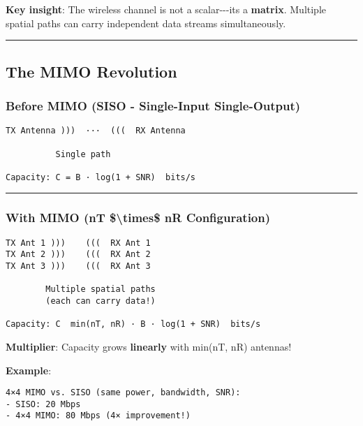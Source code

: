 \textbf{Key insight}: The wireless channel is not a
scalar-\/-\/-it\textquotesingle s a \textbf{matrix}. Multiple spatial
paths can carry independent data streams simultaneously.

\begin{center}\rule{0.5\linewidth}{0.5pt}\end{center}

\subsection{\texorpdfstring{ The MIMO
Revolution}{ The MIMO Revolution}}\label{the-mimo-revolution}

\subsubsection{Before MIMO (SISO - Single-Input
Single-Output)}\label{before-mimo-siso---single-input-single-output}

\begin{verbatim}
TX Antenna )))  ···  (((  RX Antenna
               
          Single path
          
Capacity: C = B · log(1 + SNR)  bits/s
\end{verbatim}

\begin{center}\rule{0.5\linewidth}{0.5pt}\end{center}

\subsubsection{With MIMO (nT \$\textbackslash times\$ nR
Configuration)}\label{with-mimo-nt-nr-configuration}

\begin{verbatim}
TX Ant 1 )))    (((  RX Ant 1
TX Ant 2 )))    (((  RX Ant 2
TX Ant 3 )))    (((  RX Ant 3
              
        Multiple spatial paths
        (each can carry data!)

Capacity: C  min(nT, nR) · B · log(1 + SNR)  bits/s
\end{verbatim}

\textbf{Multiplier}: Capacity grows \textbf{linearly} with min(nT, nR)
antennas!

\textbf{Example}:

\begin{verbatim}
4×4 MIMO vs. SISO (same power, bandwidth, SNR):
- SISO: 20 Mbps
- 4×4 MIMO: 80 Mbps (4× improvement!)
\end{verbatim}


